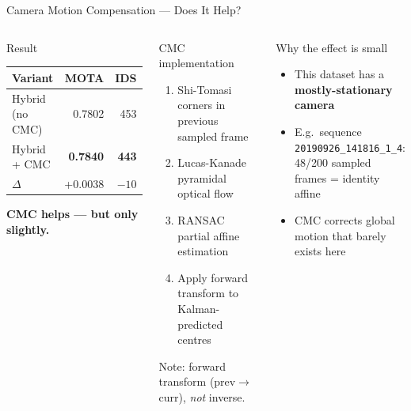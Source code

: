 \documentclass[aspectratio=169, 10pt]{beamer}
\begin{document}
\begin{frame}{Camera Motion Compensation — Does It Help?}

  \begin{columns}[T]

    \begin{block}{Result}
      \vspace{0.3em}
      \begin{tabular}{lrr}
        \toprule
        Variant & MOTA & IDS \\
        \midrule
        Hybrid (no CMC) & 0.7802 & 453 \\
        Hybrid + CMC & \textbf{0.7840} & \textbf{443} \\
        \midrule
        $\Delta$ & +0.0038 & $-10$ \\
        \bottomrule
      \end{tabular}
      \vspace{0.3em}

      \textbf{CMC helps — but only slightly.}
    \end{block}

    \vspace{0.5em}
    \begin{block}{CMC implementation}
      \begin{enumerate}
        \item Shi-Tomasi corners in previous sampled frame
        \item Lucas-Kanade pyramidal optical flow
        \item RANSAC partial affine estimation
        \item Apply forward transform to Kalman-predicted centres
      \end{enumerate}
      \small Note: forward transform (prev$\to$curr), \textit{not} inverse.
    \end{block}

    \begin{alertblock}{Why the effect is small}
      \begin{itemize}
        \item This dataset has a \textbf{mostly-stationary camera}
        \item E.g.\ sequence \texttt{20190926\_141816\_1\_4}:\\
          48/200 sampled frames = identity affine
        \item CMC corrects global motion that barely exists here
      \end{itemize}
    \end{alertblock}


\end{columns}
\end{frame}
\end{document}
